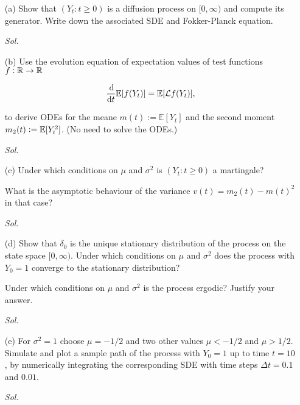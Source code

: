 \begin{enumerate}
    \item[(a)] Show that $(Y_t: t \ge 0)$ is a diffusion process on $[0, \infty)$ and compute its generator. Write down the associated SDE and Fokker-Planck equation.

        \textit{ Sol. }

    \item[(b)] Use the evolution equation of expectation values of test functions $f: \mathbb{R} \to \mathbb{R}$
    
        \begin{equation*}
            \frac{\dif}{\dif t} \mbb{E}[f(Y_t)] = \mbb{E}[\mathcal{L}f(Y_t)],
        \end{equation*}

        to derive ODEs for the meane $m(t) := \mathbb{E}[Y_t]$ and the second moment $m_2(t) := \mathbb{E}[Y_t^2]$. (No need to solve the ODEs.)

        \textit{ Sol. }

    \item[(c)] Under which conditions on $\mu$ and $\sigma^2$ is $(Y_t: t \ge 0)$ a martingale? 
    
    What is the asymptotic behaviour of the variance $v(t) = m_2(t) - m(t)^2$ in that case?
    
        \textit{ Sol. }

    \item[(d)] Show that $\delta_0$ is the unique stationary distribution of the process on the state space $[0, \infty)$. Under which conditions on $\mu$ and $\sigma^2$ does the process with $Y_0 = 1$ converge to the stationary distribution?
    
    Under which conditions on $\mu$ and $\sigma^2$ is the process ergodic? Justify your answer.

        \textit{ Sol. }

    \item[(e)] For $\sigma^2 = 1$ choose $\mu = -1/2$ and two other values $\mu < -1/2$ and $\mu > 1/2$. Simulate and plot a sample path of the process with $Y_0 = 1$ up to time $t = 10$, by numerically integrating the corresponding SDE with time steps $\Delta t = 0.1$ and $0.01$.
    
        \textit{ Sol. }

\end{enumerate}